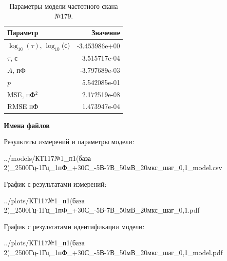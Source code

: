 \begin{table}[!ht]
    \centering
    \caption{Параметры модели частотного скана №179.}
    \begin{tabular}{|l|r|}
        \hline
        Параметр                                       & Значение                  \\ \hline
        $\log_{10}(\tau)$, $\log_{10}$(с)              & -3.453986e+00             \\ \hline
        $\tau$, с                                      & 3.515717e-04              \\ \hline
        $A$, пФ                                        & -3.797689e-03             \\ \hline
        $p$                                            & 5.542085e-01              \\ \hline
        MSE, пФ$^2$                                    & 2.172519e-08              \\ \hline
        RMSE пФ                                        & 1.473947e-04              \\ \hline
    \end{tabular}
    \label{table:frequency_scan_model_179}
\end{table}

\textbf{Имена файлов}

Результаты измерений и параметры модели:

\scriptsize../models/КТ117№1\_п1(база 2)\_2500Гц-1Гц\_1пФ\_+30С\_-5В-7В\_50мВ\_20мкс\_шаг\_0,1\_model.csv
\normalsize

График с результатами измерений:

\scriptsize../plots/КТ117№1\_п1(база 2)\_2500Гц-1Гц\_1пФ\_+30С\_-5В-7В\_50мВ\_20мкс\_шаг\_0,1.pdf
\normalsize

График с результатами идентификации модели:

\scriptsize../plots/КТ117№1\_п1(база 2)\_2500Гц-1Гц\_1пФ\_+30С\_-5В-7В\_50мВ\_20мкс\_шаг\_0,1\_model.pdf
\normalsize

